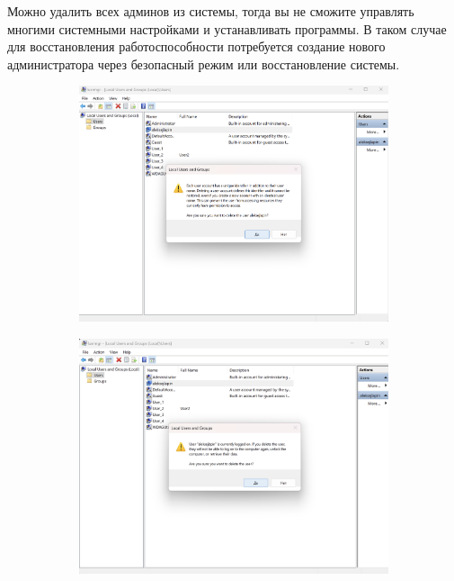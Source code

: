 \documentclass[a4paper, 14pt]{report}
\begin{document}
\setcounter{page}{2}
\tableofcontents
\newpage
{}
Можно удалить всех админов из системы, тогда вы не сможите управлять многими системными настройками и устанавливать программы. В таком случае для восстановления работоспособности потребуется создание нового администратора через безопасный режим или восстановление системы.
\begin{figure}[htbp]
    \centering
    \begin{subfigure}[c]{0.49\textwidth}
        \includegraphics[width=\textwidth]{images/Screenshot 2024-12-23 at 14.51.54.png}
        \caption{}
    \end{subfigure}
    \hfill
    \begin{subfigure}[c]{0.49\textwidth}
        \includegraphics[width=\textwidth]{images/Screenshot 2024-12-23 at 14.52.02.png}

\end{subfigure}
\end{figure}
\end{document}
